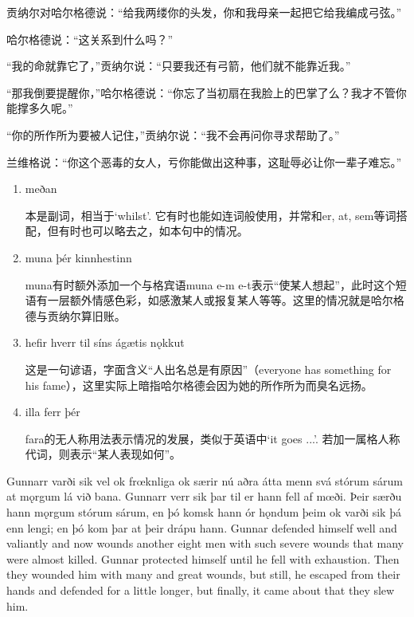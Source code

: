 \begin{translation*}{}
    贡纳尔对哈尔格德说：“给我两缕你的头发，你和我母亲一起把它给我编成弓弦。”

    哈尔格德说：“这关系到什么吗？”

    “我的命就靠它了，”贡纳尔说：“只要我还有弓箭，他们就不能靠近我。”

    “那我倒要提醒你，”哈尔格德说：“你忘了当初扇在我脸上的巴掌了么？我才不管你能撑多久呢。”

    “你的所作所为要被人记住，”贡纳尔说：“我不会再问你寻求帮助了。”

    兰维格说：“你这个恶毒的女人，亏你能做出这种事，这耻辱必让你一辈子难忘。”
\end{translation*}
\begin{grammar*}{}
    \begin{enumerate}[leftmargin=*]
        \item meðan

              本是副词，相当于`whilst'. 它有时也能如连词般使用，并常和er, at, sem等词搭配，但有时也可以略去之，如本句中的情况。

        \item muna þér kinnhestinn

              muna有时额外添加一个与格宾语muna e-m e-t表示“使某人想起”，此时这个短语有一层额外情感色彩，如感激某人或报复某人等等。这里的情况就是哈尔格德与贡纳尔算旧账。

        \item hefir hverr til síns ágætis nǫkkut

              这是一句谚语，字面含义“人出名总是有原因”（everyone has something for his fame），这里实际上暗指哈尔格德会因为她的所作所为而臭名远扬。

        \item illa ferr þér

              fara的无人称用法表示情况的发展，类似于英语中`it goes ...'. 若加一属格人称代词，则表示“某人表现如何”。
    \end{enumerate}
\end{grammar*}
\begin{paracol}{2}
    Gunnarr varði sik vel ok frœknliga ok særir nú aðra átta menn svá stórum sárum at mǫrgum lá við bana. Gunnarr verr sik þar til er hann fell af mœði. Þeir særðu hann mǫrgum stórum sárum, en þó komsk hann ór hǫndum þeim ok varði sik þá enn lengi; en þó kom þar at þeir drápu hann.
    \switchcolumn
    Gunnar defended himself well and valiantly and now wounds another eight men with such severe wounds that many were almost killed. Gunnar protected himself until he fell with exhaustion. Then they wounded him with many and great wounds, but still, he escaped from their hands and defended for a little longer, but finally, it came about that they slew him.
\end{paracol}
